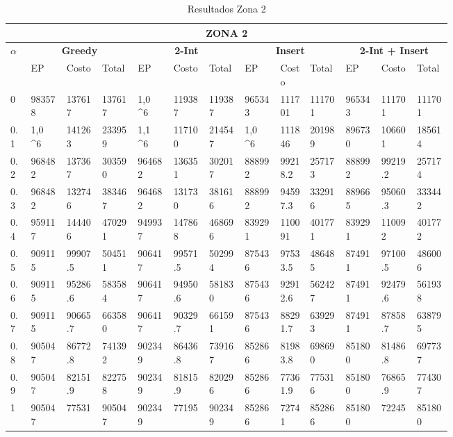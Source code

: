 \documentclass[conference]{IEEEtran}
\begin{document}
\begin{table*}[t]
\caption{Resultados Zona 2}
\centering
\begin{tabular}{|p{0.03\linewidth}|p{0.06\linewidth}|p{0.06\linewidth}|p{0.06\linewidth}|p{0.06\linewidth}|p{0.06\linewidth}|p{0.06\linewidth}|p{0.06\linewidth}|p{0.05\linewidth}|p{0.06\linewidth}|p{0.06\linewidth}|p{0.06\linewidth}|p{0.06\linewidth}|}
\hline
\multicolumn{13}{|c|}{\textbf{ZONA 2}} \\ 
\hline

\multirow{2}{*}{\textbf{$\alpha$}}  & \multicolumn{3}{|c|}{\textbf{Greedy}} & \multicolumn{3}{|c|}{\textbf{2-Int}} & \multicolumn{3}{|c|}{\textbf{Insert}} & \multicolumn{3}{|c|}{\textbf{2-Int + Insert}} \\

\cline{2-13}
 & EP & Costo & Total & EP & Costo & Total & EP & Costo & Total & EP & Costo & Total  \\
\hline
0 & 983578 & 137617 & 137617 & 1,0 \cdot 10^6 & 119387 & 119387 & 965343 & 111701 & 111701 & 965343 & 111701 & 111701  \\
\hline

0.1 & 1,0 \cdot 10^6 & 141263 & 233959 & 1,1 \cdot 10^6 & 117100 & 214547 & 1,0 \cdot 10^6 & 111846 & 201989 & 896730 & 106601 & 185614  \\
\hline

0.2 & 968482 & 137367 & 303590 & 964682 & 136351 & 302017 & 888992 & 99218.2 & 257173 & 888992 & 99219.2 & 257174  \\
\hline

0.3 & 968482 & 132746 & 383467 & 964682 & 131730 & 381616 & 888992 & 94597.3 & 332916 & 889665 & 95060.3 & 333442  \\
\hline

0.4 & 959117 & 144406 & 470291 & 949937 & 147868 & 468696 & 839291 & 110091 & 401771 & 839291 & 110092 & 401772  \\
\hline

0.5 & 909115 & 99907.5 & 504511 & 906417 & 99571.5 & 502994 & 875436 & 97533.5 & 486485 & 874911 & 97100.5 & 486006  \\
\hline

0.6 & 909115 & 95286.6 & 583584 & 906417 & 94950.6 & 581830 & 875436 & 92912.6 & 562427 & 874911 & 92479.6 & 561938  \\
\hline

0.7 & 909115 & 90665.7 & 663580 & 906417 & 90329.7 & 661591 & 875436 & 88291.7 & 639293 & 874911 & 87858.7 & 638795  \\
\hline

0.8 & 905047 & 86772.8 & 741392 & 902349 & 86436.8 & 739167 & 852866 & 81983.8 & 698690 & 851800 & 81486.8 & 697737  \\
\hline

0.9 & 905047 & 82151.9 & 822758 & 902349 & 81815.9 & 820296 & 852866 & 77361.9 & 775316 & 851800 & 76865.9 & 774307  \\
\hline

1 & 905047 & 77531 & 905047 & 902349 & 77195 & 902349 & 852866 & 72741 & 852866 & 851800 & 72245 & 851800  \\
\hline
\end{tabular}
\end{table*}
\end{document}
